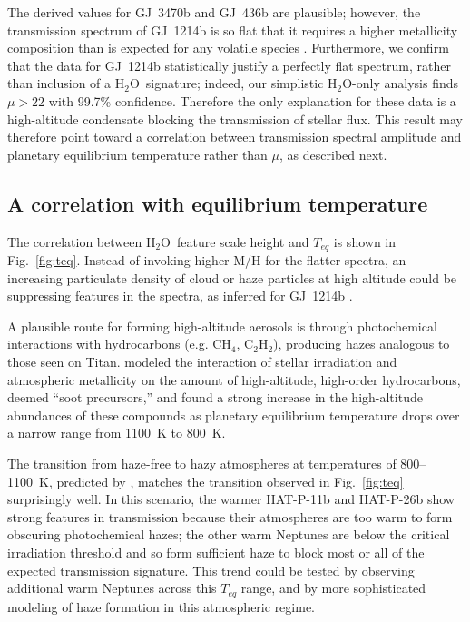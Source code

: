 \documentclass[twocolumn]{aastex61}
\newcommand{\water}{H$_2$O}
\begin{document}
The derived values for GJ~3470b and GJ~436b are plausible; however,
the transmission spectrum of GJ~1214b is so flat that it requires a
higher metallicity composition than is expected for any volatile
species \citep{kreidberg:2014,morley:2015}. Furthermore, we confirm
that the data for GJ~1214b statistically justify a perfectly flat
spectrum, rather than inclusion of a \water\ signature; indeed, our
simplistic \water-only analysis finds $\mu>22$ with 99.7\% confidence.
Therefore the only explanation for these data is a high-altitude
condensate blocking the transmission of stellar flux.  This result may
therefore point toward a correlation between transmission spectral
amplitude and planetary equilibrium temperature rather than $\mu$, as
described next.



\subsection{A correlation with equilibrium temperature}
The correlation between \water\ feature scale height and $T_{eq}$ is shown in Fig.~\ref{fig:teq}. Instead of invoking higher M/H for the flatter spectra, an increasing particulate density of cloud or haze particles at high altitude could be suppressing features in the spectra, as inferred for GJ~1214b \citep[e.g.,][]{kreidberg:2014}.
 
A plausible route for forming high-altitude aerosols is through photochemical interactions with hydrocarbons (e.g. CH$_4$, C$_2$H$_2$), producing hazes analogous to those seen on Titan.   \cite{morley:2015} modeled the interaction of stellar irradiation and atmospheric metallicity on the amount of high-altitude, high-order hydrocarbons, deemed ``soot precursors,'' and found a strong increase in the high-altitude abundances of these compounds as planetary equilibrium temperature drops over a narrow range from 1100~K to 800~K.  

The transition from haze-free to hazy atmospheres at temperatures of 800--1100~K, predicted by \cite{morley:2015}, matches the transition observed in Fig.~\ref{fig:teq} surprisingly well.  In this scenario,  the warmer HAT-P-11b and HAT-P-26b show strong features in transmission because their atmospheres are too warm to form obscuring photochemical hazes; the other warm Neptunes are below the critical irradiation threshold and so form sufficient haze to block most or all of the expected transmission signature.  This trend could be tested by observing additional warm Neptunes across this $T_{eq}$ range, and by more sophisticated modeling of haze formation in this atmospheric regime.
\end{document}
